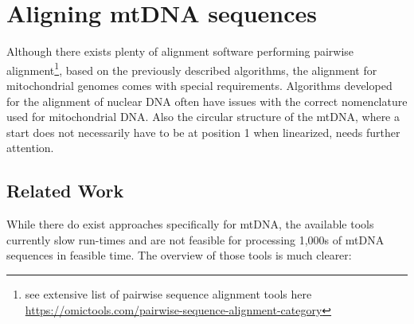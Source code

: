 \section{Aligning mtDNA sequences}
Although there exists plenty of alignment software performing pairwise alignment\footnote{see extensive list of pairwise sequence alignment tools here \url{https://omictools.com/pairwise-sequence-alignment-category}}, based on the previously described algorithms, the alignment for mitochondrial genomes comes with special requirements. Algorithms developed for the alignment of nuclear DNA often have issues with the correct nomenclature used for mitochondrial DNA. Also the circular structure of the mtDNA, where a start does not necessarily have to be at position 1 when linearized, needs further attention. 
\subsection{Related Work}
While there do exist approaches specifically for mtDNA, the available tools currently slow run-times and are not feasible for processing 1,000s of mtDNA sequences in feasible time. The overview of those tools is much clearer:
